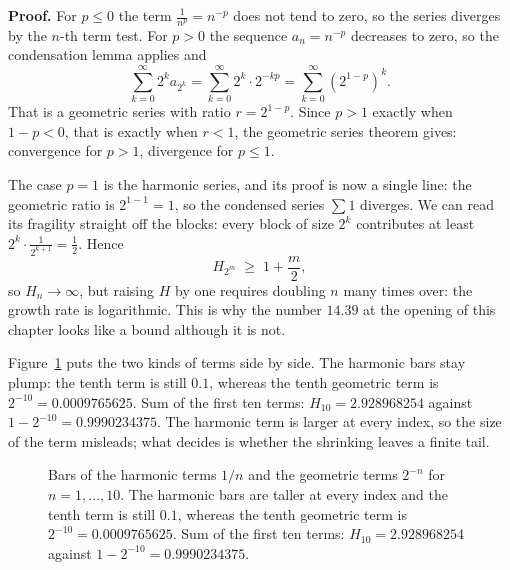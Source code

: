 \noindent\textbf{Proof.} For $p \le 0$ the term $\frac{1}{n^p} = n^{-p}$ does not tend to
zero, so the series diverges by the $n$-th term test. For $p>0$ the sequence
$a_n = n^{-p}$ decreases to zero, so the condensation lemma applies and
\[
  \sum_{k=0}^{\infty} 2^k a_{2^k}
  = \sum_{k=0}^{\infty} 2^k \cdot 2^{-kp}
  = \sum_{k=0}^{\infty} \left(2^{1-p}\right)^{k}.
\]
That is a geometric series with ratio $r = 2^{1-p}$. Since $p>1$ exactly when $1-p<0$,
that is exactly when $r<1$, the geometric series theorem gives: convergence for $p>1$,
divergence for $p \le 1$.

The case $p=1$ is the harmonic series, and its proof is now a single
line: the geometric ratio is $2^{1-1} = 1$, so the condensed series $\sum 1$ diverges. We
can read its fragility straight off the blocks: every block of size $2^k$ contributes at
least $2^k \cdot \frac{1}{2^{k+1}} = \tfrac{1}{2}$. Hence
\[
  H_{2^m} \;\ge\; 1 + \frac{m}{2},
\]
so $H_n \to \infty$, but raising $H$ by one requires doubling $n$ many times over: the
growth rate is logarithmic. This is why the number $14.39$ at the opening of this chapter
looks like a bound although it is not.

Figure~\ref{fig:batang-suku} puts the two kinds of terms side by side. The harmonic bars
stay plump: the tenth term is still $0.1$, whereas the tenth geometric term is
$2^{-10} = 0.0009765625$. Sum of the first ten terms: $H_{10} = 2.928968254$ against
$1 - 2^{-10} = 0.9990234375$. The harmonic term is larger at every index, so the size of
the term misleads; what decides is whether the shrinking leaves a finite tail.

\begin{figure}[htbp]
\centering
{}
\caption{Bars of the harmonic terms $1/n$ and the geometric terms $2^{-n}$ for
$n=1,\ldots,10$. The harmonic bars are taller at every index and the tenth term is still
$0.1$, whereas the tenth geometric term is $2^{-10} = 0.0009765625$. Sum of the first ten
terms: $H_{10} = 2.928968254$ against $1 - 2^{-10} = 0.9990234375$.}
\label{fig:batang-suku}
\end{figure}


